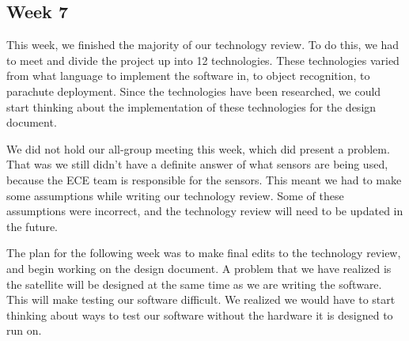 \documentclass[10pt,letterpaper,onecolumn,draftclsnofoot,journal]{IEEEtran}
\begin{document}
\subsection{Week 7}
\par
This week, we finished the majority of our technology review. To do this, we had to meet and divide the project up into 12 technologies. These technologies varied from what language to implement the software in, to object recognition, to parachute deployment. Since the technologies have been researched, we could start thinking about the implementation of these technologies for the design document.\vspace{.3cm}
\par
We did not hold our all-group meeting this week, which did present a problem. That was we still didn't have a definite answer of what sensors are being used, because the ECE team is responsible for the sensors. This meant we had to make some assumptions while writing our technology review. Some of these assumptions were incorrect, and the technology review will need to be updated in the future.\vspace{.3cm}
\par
The plan for the following week was to make final edits to the technology review, and begin working on the design document. A problem that we have realized is the satellite will be designed at the same time as we are writing the software. This will make testing our software difficult. We realized we would have to start thinking about ways to test our software without the hardware it is designed to run on.\vspace{.3cm}
\end{document}
